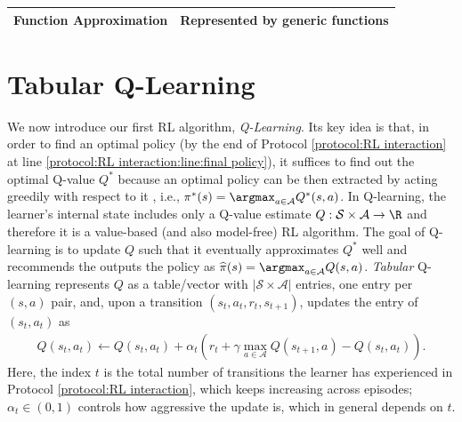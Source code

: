 \begin{table}[tb]
\begin{tabular}{|l|lll|}
Function Approximation & \multicolumn{3}{l|}{Represented by generic functions}                                                                                                                                                                                                                                   \\ \hline
\end{tabular}
\end{table}

\section{Tabular Q-Learning}
We now introduce our first RL algorithm, {\em Q-Learning}.
Its key idea is that, in order to find an optimal policy (by the end of Protocol \ref{protocol:RL interaction} at line \ref{protocol:RL interaction:line:final policy}), it suffices to find out the optimal Q-value $Q^*$ because an optimal policy can be then extracted by acting greedily with respect to it , i.e., $\pi^*(s)=\argmax_{a\in\mathcal{A}} Q^*(s,a)$.
In Q-learning, the learner's internal state includes only a Q-value estimate $Q:\mathcal{S}\times\mathcal{A}\to\R$ and therefore it is a value-based (and also model-free) RL algorithm.
The goal of Q-learning is to update $Q$ such that it eventually approximates $Q^*$ well and recommends the outputs the policy as $\widehat{\pi}(s) = \argmax_{a\in\mathcal{A}}Q(s,a)$.
{\em Tabular} Q-learning represents $Q$ as a table/vector with $|\mathcal{S}\times\mathcal{A}|$ entries, one entry per $(s,a)$ pair, and, upon a transition $(s_t,a_{t},r_t,s_{t+1})$, updates the entry of $(s_t,a_t)$ as
\begin{align}
\label{eq:Q-learning}
Q(s_t,a_t) \gets Q(s_t,a_t) + \alpha_t\left(r_t+\gamma\max_{a\in\mathcal{A}}Q(s_{t+1},a)-Q(s_t,a_t) \right). 
\end{align}
Here, the index $t$ is the total number of transitions the learner has experienced in Protocol \ref{protocol:RL interaction}, which keeps increasing across episodes;
$\alpha_t\in(0,1)$ controls how aggressive the update is, which in general depends on $t$.

